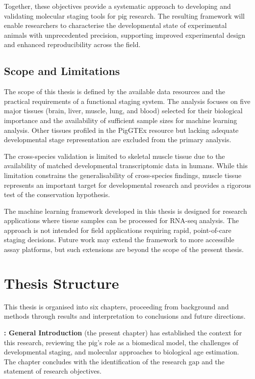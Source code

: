 Together, these objectives provide a systematic approach to developing and validating molecular staging tools for pig research. The resulting framework will enable researchers to characterise the developmental state of experimental animals with unprecedented precision, supporting improved experimental design and enhanced reproducibility across the field.

\subsection{Scope and Limitations}

The scope of this thesis is defined by the available data resources and the practical requirements of a functional staging system. The analysis focuses on five major tissues (brain, liver, muscle, lung, and blood) selected for their biological importance and the availability of sufficient sample sizes for machine learning analysis. Other tissues profiled in the PigGTEx resource but lacking adequate developmental stage representation are excluded from the primary analysis.

The cross-species validation is limited to skeletal muscle tissue due to the availability of matched developmental transcriptomic data in humans. While this limitation constrains the generalisability of cross-species findings, muscle tissue represents an important target for developmental research and provides a rigorous test of the conservation hypothesis.

The machine learning framework developed in this thesis is designed for research applications where tissue samples can be processed for RNA-seq analysis. The approach is not intended for field applications requiring rapid, point-of-care staging decisions. Future work may extend the framework to more accessible assay platforms, but such extensions are beyond the scope of the present thesis.


\section{Thesis Structure}\label{sec:intro:structure}

This thesis is organised into six chapters, proceeding from background and methods through results and interpretation to conclusions and future directions.

\textbf{: General Introduction} (the present chapter) has established the context for this research, reviewing the pig's role as a biomedical model, the challenges of developmental staging, and molecular approaches to biological age estimation. The chapter concludes with the identification of the research gap and the statement of research objectives.

